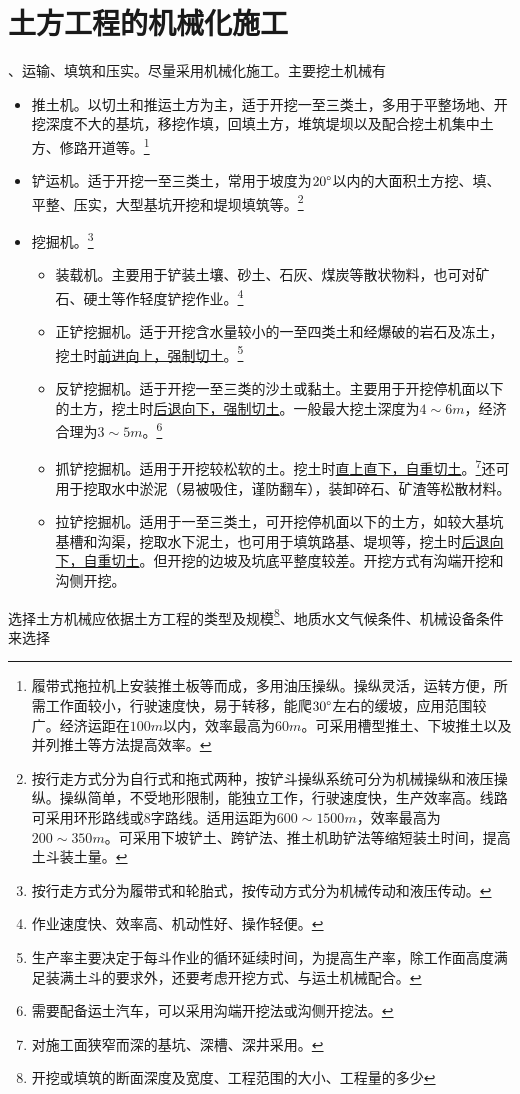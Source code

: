 \documentclass{book}
\begin{document}
\section{土方工程的机械化施工}
、运输、填筑和压实。尽量采用机械化施工。主要挖土机械有
\begin{itemize}
    \item 推土机。以切土和推运土方为主，适于开挖一至三类土，多用于平整场地、开挖深度不大的基坑，移挖作填，回填土方，堆筑堤坝以及配合挖土机集中土方、修路开道等。\footnote{履带式拖拉机上安装推土板等而成，多用油压操纵。操纵灵活，运转方便，所需工作面较小，行驶速度快，易于转移，能爬$30\degree$左右的缓坡，应用范围较广。经济运距在$100m$以内，效率最高为$60m$。可采用槽型推土、下坡推土以及并列推土等方法提高效率。}
    \item 铲运机。适于开挖一至三类土，常用于坡度为$20\degree$以内的大面积土方挖、填、平整、压实，大型基坑开挖和堤坝填筑等。\footnote{按行走方式分为自行式和拖式两种，按铲斗操纵系统可分为机械操纵和液压操纵。操纵简单，不受地形限制，能独立工作，行驶速度快，生产效率高。线路可采用环形路线或$8$字路线。适用运距为$600\sim1500m$，效率最高为$200\sim350m$。可采用下坡铲土、跨铲法、推土机助铲法等缩短装土时间，提高土斗装土量。}
    \item 挖掘机。\footnote{按行走方式分为履带式和轮胎式，按传动方式分为机械传动和液压传动。}
    \begin{itemize}
        \item 装载机。主要用于铲装土壤、砂土、石灰、煤炭等散状物料，也可对矿石、硬土等作轻度铲挖作业。\footnote{作业速度快、效率高、机动性好、操作轻便。}
        \item 正铲挖掘机。适于开挖含水量较小的一至四类土和经爆破的岩石及冻土，挖土时\underline{前进向上，强制切土}。\footnote{生产率主要决定于每斗作业的循环延续时间，为提高生产率，除工作面高度满足装满土斗的要求外，还要考虑开挖方式、与运土机械配合。}
        \item 反铲挖掘机。适于开挖一至三类的沙土或黏土。主要用于开挖停机面以下的土方，挖土时\underline{后退向下，强制切土}。一般最大挖土深度为$4\sim6m$，经济合理为$3\sim5m$。\footnote{需要配备运土汽车，可以采用沟端开挖法或沟侧开挖法。}
        \item 抓铲挖掘机。适用于开挖较松软的土。挖土时\underline{直上直下，自重切土}。\footnote{对施工面狭窄而深的基坑、深槽、深井采用。}还可用于挖取水中淤泥（易被吸住，谨防翻车），装卸碎石、矿渣等松散材料。
        \item 拉铲挖掘机。适用于一至三类土，可开挖停机面以下的土方，如较大基坑基槽和沟渠，挖取水下泥土，也可用于填筑路基、堤坝等，挖土时\underline{后退向下，自重切土}。但开挖的边坡及坑底平整度较差。开挖方式有沟端开挖和沟侧开挖。
    \end{itemize}
\end{itemize}
选择土方机械应依据土方工程的类型及规模\footnote{开挖或填筑的断面深度及宽度、工程范围的大小、工程量的多少}、地质水文气候条件、机械设备条件来选择
\end{document}
